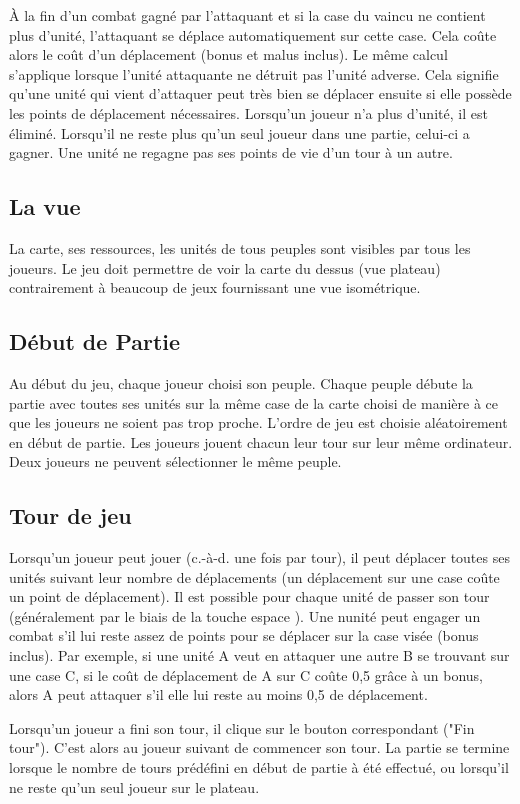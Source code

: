 	À la fin d’un combat gagné par l’attaquant et si la case du vaincu ne contient plus d’unité, l’attaquant se déplace automatiquement sur cette case. Cela coûte alors le coût d’un déplacement (bonus et malus inclus). Le même calcul s’applique lorsque l’unité attaquante ne détruit pas l’unité adverse.	Cela signifie qu’une unité qui vient d’attaquer peut très bien se déplacer ensuite si elle possède les points de déplacement nécessaires. Lorsqu’un joueur n’a plus d’unité, il est éliminé. Lorsqu’il ne reste plus qu’un seul joueur dans une partie, celui-ci a gagner. Une unité ne regagne pas ses points de vie d’un tour à un autre.
	
	\subsection{La vue}
	La carte, ses ressources, les unités de tous peuples sont visibles par tous les joueurs. Le jeu doit
	permettre de voir la carte du dessus (vue plateau) contrairement à beaucoup de jeux fournissant
	une vue isométrique.
	
	\subsection{Début de Partie}
	Au début du jeu, chaque joueur choisi son peuple. Chaque peuple débute la partie avec toutes ses
	unités sur la même case de la carte choisi de manière à ce que les joueurs ne soient pas trop proche.
	L’ordre de jeu est choisie aléatoirement en début de partie. Les joueurs jouent chacun leur tour sur
	leur même ordinateur. Deux joueurs ne peuvent sélectionner le même peuple.
	
	\subsection{Tour de jeu}
	Lorsqu’un joueur peut jouer (c.-à-d. une fois par tour), il peut déplacer toutes ses unités suivant
	leur nombre de déplacements (un déplacement sur une case coûte un point de déplacement). Il est possible pour chaque unité de passer son tour (généralement par le biais de la touche espace
	). Une nunité peut engager un combat s’il lui reste assez de points pour se déplacer sur la case visée (bonus inclus). Par exemple, si une unité A veut en attaquer une autre B	se trouvant sur une case C, si le coût de déplacement de A sur C coûte 0,5 grâce à un bonus, alors A peut attaquer s’il elle lui reste au moins 0,5 de déplacement.	

	Lorsqu’un joueur a fini son tour, il clique sur le bouton correspondant ("Fin tour"). C’est alors au
	joueur suivant de commencer son tour. La partie se termine lorsque le nombre de tours prédéfini
	en début de partie à été effectué, ou lorsqu’il ne reste qu’un seul joueur sur le plateau.
